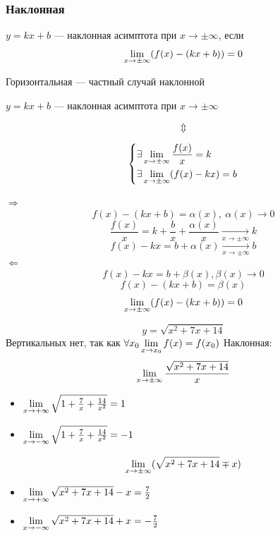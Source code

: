 \subsubsection{Наклонная}

\begin{definition}
    $y = kx + b$ --- наклонная асимптота при $x \to \pm \infty$, если 
    \[
        \lim\limits_{x \to \pm \infty} (f(x) - (kx + b)) = 0
    \]
\end{definition}

\begin{remark}
    Горизонтальная --- частный случай наклонной
\end{remark}

\begin{theorem}
    $y = kx + b$ --- наклонная асимптота при $x \to \pm \infty$

    \[
        \Updownarrow
    \]

    \[
        \begin{dcases}
            \exists \lim\limits_{x \to \pm \infty} \frac{f(x)}{x} = k\\
            \exists \lim\limits_{x \to \pm \infty} (f(x) - kx) = b
        \end{dcases}
    \]
\end{theorem}

\begin{Proof}
    {\bf $\Rightarrow$}
    \[
        f(x) - (kx + b) = \alpha(x),\ \alpha(x) \to 0
    \]
    \[
        \frac{f(x)}{x} = k + \frac{b}{x} + \frac{\alpha(x)}{x} \xrightarrow[x \to \pm \infty ]{} k
    \]
    \[
        f(x) - kx = b + \alpha(x) \xrightarrow[x \to \pm \infty ]{}  b
    \]
    {\bf $\Leftarrow$}
    \[
        f(x) - kx = b + \beta (x), \beta (x) \to 0
    \]
    \[
        f(x) - (kx + b) = \beta (x)
    \]
    \[
        \lim\limits_{x \to \pm \infty} (f(x) - (kx + b)) = 0
    \]
\end{Proof}

\begin{example}
    \[
        y = \sqrt{x^2 + 7x + 14} 
    \]
    Вертикальных нет, так как $\forall x_0 \lim\limits_{x \to x_0} f(x) = f(x_0)$
    Наклонная:
    \[
        \lim\limits_{x \to \pm \infty} \frac{\sqrt{x^2 + 7x + 14}}{x}
    \]
    \begin{itemize}
        \item[1)] 
        $
            \lim\limits_{x \to +\infty } \sqrt{1 + \frac{7}{x} + \frac{14}{x^2}} = 1
        $
        \item[2)]
        $
            \lim\limits_{x \to -\infty } \sqrt{1 + \frac{7}{x} + \frac{14}{x^2}} = -1
        $
    \end{itemize}
    \[
        \lim\limits_{x \to \pm \infty} (\sqrt{x^2 + 7x + 14} \mp x)
    \]
    \begin{itemize} 
        \item[1)]
        $
            \lim\limits_{x \to +\infty} \sqrt{x^2 + 7x + 14} - x = \frac{7}{2} 
        $
        \item[2)]
        $
            \lim\limits_{x \to -\infty} \sqrt{x^2 + 7x + 14} + x = - \frac{7}{2} 
        $
    \end{itemize}
\end{example}

